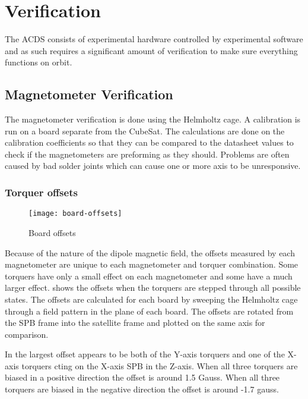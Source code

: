 
\chapter{Verification}

\label{ch:Verification}

The \ac{ACDS} consists of experimental hardware controlled by experimental software and as such requires a significant amount of verification to make sure everything functions on orbit.

\section{Magnetometer Verification}

The magnetometer verification is done using the Helmholtz cage. A calibration is run on a board separate from the CubeSat. The calculations are done on the calibration coefficients so that they can be compared to the datasheet values to check if the magnetometers are preforming as they should. Problems are often caused by bad solder joints which can cause one or more axis to be unresponsive.

\subsection{Torquer offsets}

\begin{figure}[!ht]
    \centering
    \texttt{[image: board-offsets]}
    \caption{Board offsets}
    \label{fig:b-offset}
\end{figure}

Because of the nature of the dipole magnetic field, the offsets measured by each magnetometer are unique to each magnetometer and torquer combination. Some torquers have only a small effect on each magnetometer and some have a much larger effect.  shows the offsets when the torquers are stepped through all possible states. The offsets are calculated for each board by sweeping the Helmholtz cage through a field pattern in the plane of each board. The offsets are rotated from the \ac{SPB} frame into the satellite frame and plotted on the same axis for comparison.

In  the largest offset appears to be both of the Y-axis torquers and one of the X-axis torquers cting on the X-axis \ac{SPB} in the Z-axis. When all three torquers are biased in a positive direction the offset is around 1.5 Gauss. When all three torquers are biased in the negative direction the offset is around -1.7 gauss.


